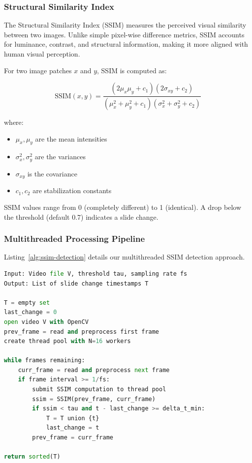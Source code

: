 \subsubsection{Structural Similarity Index}

The Structural Similarity Index (SSIM) \cite{wang2004image} measures the perceived visual similarity between two images. Unlike simple pixel-wise difference metrics, SSIM accounts for luminance, contrast, and structural information, making it more aligned with human visual perception.

For two image patches $x$ and $y$, SSIM is computed as:

\begin{equation}
    \text{SSIM}(x, y) = \frac{(2\mu_x\mu_y + c_1)(2\sigma_{xy} + c_2)}{(\mu_x^2 + \mu_y^2 + c_1)(\sigma_x^2 + \sigma_y^2 + c_2)}
\end{equation}

where:
\begin{itemize}
    \item $\mu_x, \mu_y$ are the mean intensities
    \item $\sigma_x^2, \sigma_y^2$ are the variances
    \item $\sigma_{xy}$ is the covariance
    \item $c_1, c_2$ are stabilization constants
\end{itemize}

SSIM values range from 0 (completely different) to 1 (identical). A drop below the threshold (default 0.7) indicates a slide change.

\subsubsection{Multithreaded Processing Pipeline}

Listing~\ref{alg:ssim-detection} details our multithreaded SSIM detection approach.

\begin{lstlisting}[language=Python, caption={Multithreaded SSIM Slide Detection}, label={alg:ssim-detection}]
Input: Video file V, threshold tau, sampling rate fs
Output: List of slide change timestamps T

T = empty set
last_change = 0
open video V with OpenCV
prev_frame = read and preprocess first frame
create thread pool with N=16 workers

while frames remaining:
    curr_frame = read and preprocess next frame
    if frame interval >= 1/fs:
        submit SSIM computation to thread pool
        ssim = SSIM(prev_frame, curr_frame)
        if ssim < tau and t - last_change >= delta_t_min:
            T = T union {t}
            last_change = t
        prev_frame = curr_frame

return sorted(T)
\end{lstlisting}

